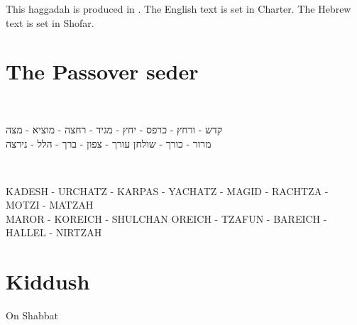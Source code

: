 \documentclass[12pt,a4wide,openany]{memoir}
\newcommand{\CH}{CH}
\newenvironment{HgHebrew}{\begin{hebrew}\strut\\\noindent\Large}{\end{hebrew}}
\newenvironment{HgTranslit}{\strut\\\noindent\begin{itshape}}{\end{itshape}\vspace{1em}}
\begin{document}
\vfill
\noindent
This  haggadah is produced in {\XeLaTeX}. The English text is
set in Charter. The Hebrew text is set in Shofar.

\newpage


\chapter{The Passover seder}

\vfill

\vspace{-2em}
\begin{HgHebrew}
  \begin{center}
  קדש 
  -
  ורחץ
  -
  כרפס 
  -
  יחץ 
  -
  מגיד 
  -
  רחצה 
  -
  מוציא
  -
  מצה 
  \\
  מרור 
  -
  כורך 
  -
  שולחן עורך 
  -
  צפון
  -
  ברך 
  -
  הלל 
  -
  נירצה 
  \end{center}
\end{HgHebrew}
\vspace{-3em}
\begin{HgTranslit}
  \begin{center}
  {\small 
    KADESH - UR{\CH}ATZ - KARPAS - YA{\CH}ATZ - %
    MAGID - RA{\CH}TZA - MOTZI - MATZAH \\ 
    MAROR - KOREI{\CH} - SHUL{\CH}AN OREI{\CH} - %
    TZAFUN - BAREI{\CH} - HALLEL - NIRTZAH}
  \end{center}
\end{HgTranslit}



\newpage


\tableofcontents*

\newpage
\setcounter{page}{1}


\chapter{Kiddush}

\vspace*{-3cm}

\noindent
On Shabbat
\end{document}
